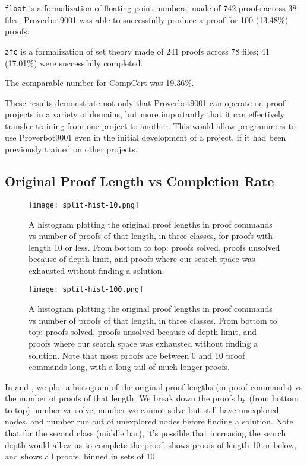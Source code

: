 \documentclass[sigplan,screen]{acmart}
\renewcommand{\>}{\quad}
\begin{document}
\texttt{float} is a formalization of floating point numbers, made of 742 proofs across 38 files;
  Proverbot9001 was able to successfully produce a proof for 100 (13.48\%) proofs.

\texttt{zfc} is a formalization of set theory made of 241 proofs across 78 files;
  41 (17.01\%) were successfully completed.

The comparable number for CompCert was 19.36\%.

These results demonstrate
  not only that Proverbot9001 can operate on proof projects in a variety of domains,
  but more importantly that it can effectively transfer training
  from one project to another.
This would allow programmers to use Proverbot9001
  even in the initial development of a project,
  if it had been previously trained on other projects.

\subsection{Original Proof Length vs Completion Rate}
\label{ssec:length-completion}

\begin{figure}
\texttt{[image: split-hist-10.png]}
\caption{A histogram plotting the original proof lengths in proof
  commands vs number of proofs of that length, in three classes, for
  proofs with length 10 or less. From bottom to top: proofs solved,
  proofs unsolved because of depth limit, and proofs where our search
  space was exhausted without finding a solution.}
\label{fig:orig-split-hist-10}
\end{figure}
\begin{figure}
\texttt{[image: split-hist-100.png]}
\caption{A histogram plotting the original proof lengths in proof
  commands vs number of proofs of that length, in three classes. From
  bottom to top: proofs solved, proofs unsolved because of depth
  limit, and proofs where our search space was exhausted without
  finding a solution. Note that most proofs are between 0 and 10 proof
  commands long, with a long tail of much longer proofs.}
\label{fig:orig-split-hist-100}
\end{figure}

In  and , we plot a histogram
  of the original proof lengths (in proof commands)
  vs the number of proofs of that length.
We break down the proofs by (from bottom to top)
  number we solve,
  number we cannot solve but still have unexplored nodes,
  and number run out of unexplored nodes before finding a solution.
Note that for the second class (middle bar), it's
  possible that increasing the search depth would allow us to complete
  the proof.
 shows proofs of length 10 or below, and  shows all proofs, binned in sets of 10.
\end{document}
